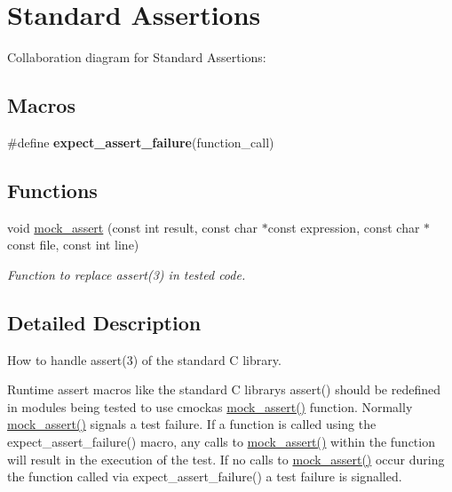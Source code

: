 \hypertarget{group__cmocka__mock__assert}{}\section{Standard Assertions}
\label{group__cmocka__mock__assert}
Collaboration diagram for Standard Assertions\+:
\subsection*{Macros}
\begin{DoxyCompactItemize}
\item 
\#define {\bfseries expect\+\_\+assert\+\_\+failure}(function\+\_\+call)
\end{DoxyCompactItemize}
\subsection*{Functions}
\begin{DoxyCompactItemize}
\item 
void \hyperlink{group__cmocka__mock__assert_ga7f1663184edbd6120732191c4bffada2}{mock\+\_\+assert} (const int result, const char $\ast$const expression, const char $\ast$const file, const int line)
\begin{DoxyCompactList}\small\item\em Function to replace assert(3) in tested code. \end{DoxyCompactList}\end{DoxyCompactItemize}


\subsection{Detailed Description}
How to handle assert(3) of the standard C library.

Runtime assert macros like the standard C library\textquotesingle{}s assert() should be redefined in modules being tested to use cmocka\textquotesingle{}s \hyperlink{group__cmocka__mock__assert_ga7f1663184edbd6120732191c4bffada2}{mock\+\_\+assert()} function. Normally \hyperlink{group__cmocka__mock__assert_ga7f1663184edbd6120732191c4bffada2}{mock\+\_\+assert()} signals a test failure. If a function is called using the expect\+\_\+assert\+\_\+failure() macro, any calls to \hyperlink{group__cmocka__mock__assert_ga7f1663184edbd6120732191c4bffada2}{mock\+\_\+assert()} within the function will result in the execution of the test. If no calls to \hyperlink{group__cmocka__mock__assert_ga7f1663184edbd6120732191c4bffada2}{mock\+\_\+assert()} occur during the function called via expect\+\_\+assert\+\_\+failure() a test failure is signalled. 

